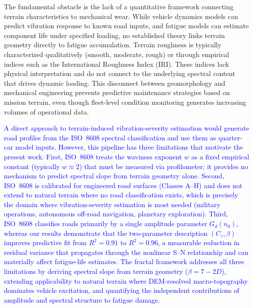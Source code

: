 \documentclass[11pt]{article}
\begin{document}
The fundamental obstacle is the lack of a quantitative framework connecting terrain characteristics to mechanical wear. While vehicle dynamics models can predict vibration response to known road inputs\cite{Wong2022,Gillespie1992}, and fatigue models can estimate component life under specified loading\cite{Basquin1910,Dowling2013}, no established theory links terrain geometry directly to fatigue accumulation. Terrain roughness is typically characterized qualitatively (smooth, moderate, rough) or through empirical indices such as the International Roughness Index (IRI)\cite{ISO8608}. These indices lack physical interpretation and do not connect to the underlying spectral content that drives dynamic loading. This disconnect between geomorphology and mechanical engineering prevents predictive maintenance strategies based on mission terrain, even though fleet-level condition monitoring generates increasing volumes of operational data\cite{Zhu2019}.

\textcolor{blue}{A direct approach to terrain-induced vibration-severity estimation would generate road profiles from the ISO~8608 spectral classification\cite{ISO8608} and use them as quarter-car model inputs. However, this pipeline has three limitations that motivate the present work. First, ISO~8608 treats the waviness exponent $w$ as a fixed empirical constant (typically $w \approx 2$) that must be measured via profilometer; it provides no mechanism to predict spectral slope from terrain geometry alone. Second, ISO~8608 is calibrated for engineered road surfaces (Classes A--H) and does not extend to natural terrain where no road classification exists, which is precisely the domain where vibration-severity estimation is most needed (military operations, autonomous off-road navigation, planetary exploration). Third, ISO~8608 classifies roads primarily by a single amplitude parameter $G_d(n_0)$, whereas our results demonstrate that the two-parameter description $(C_z, \beta)$ improves predictive fit from $R^2 = 0.91$ to $R^2 = 0.96$, a measurable reduction in residual variance that propagates through the nonlinear S--N relationship and can materially affect fatigue-life estimates. The fractal framework addresses all three limitations by deriving spectral slope from terrain geometry ($\beta = 7-2D$), extending applicability to natural terrain where DEM-resolved macro-topography dominates vehicle excitation, and quantifying the independent contributions of amplitude and spectral structure to fatigue damage.}
\end{document}
